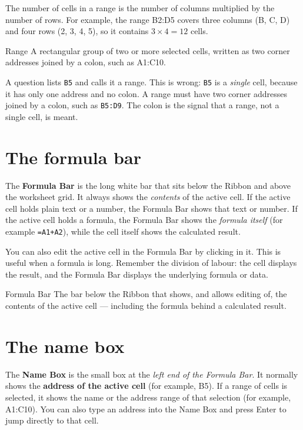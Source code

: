 The number of cells in a range is the number of columns multiplied by the
number of rows. For example, the range B2:D5 covers three columns (B, C, D)
and four rows (2, 3, 4, 5), so it contains $3 \times 4 = 12$ cells.

\begin{definitionbox}{Range}
A rectangular group of two or more selected cells, written as two corner
addresses joined by a colon, such as A1:C10.
\end{definitionbox}

\begin{example}
A question lists \texttt{B5} and calls it a range. This is wrong: \texttt{B5}
is a \emph{single} cell, because it has only one address and no colon. A
range must have two corner addresses joined by a colon, such as
\texttt{B5:D9}. The colon is the signal that a range, not a single cell, is
meant.
\end{example}

\section{The formula bar}
The \textbf{Formula Bar} is the long white bar that sits below the Ribbon
and above the worksheet grid. It always shows the \emph{contents} of the
active cell. If the active cell holds plain text or a number, the Formula
Bar shows that text or number. If the active cell holds a formula, the
Formula Bar shows the \emph{formula itself} (for example
\texttt{=A1+A2}), while the cell itself shows the calculated result.

You can also edit the active cell in the Formula Bar by clicking in it. This
is useful when a formula is long. Remember the division of labour: the cell
displays the result, and the Formula Bar displays the underlying formula or
data.

\begin{definitionbox}{Formula Bar}
The bar below the Ribbon that shows, and allows editing of, the contents of
the active cell --- including the formula behind a calculated result.
\end{definitionbox}

\section{The name box}
The \textbf{Name Box} is the small box at the \emph{left end of the Formula
Bar}. It normally shows the \textbf{address of the active cell} (for
example, B5). If a range of cells is selected, it shows the name or the
address range of that selection (for example, A1:C10). You can also type an
address into the Name Box and press Enter to jump directly to that cell.

